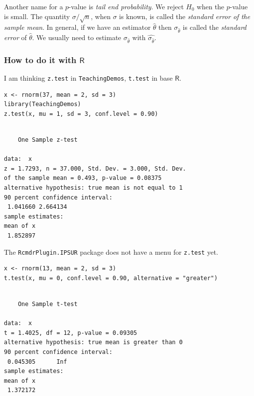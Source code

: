 \documentclass[captions=tableheading]{scrbook}
\begin{document}
\begin{rem}
Another name for a \(p\)-value is \emph{tail end probability}. We reject \(H_{0}\) when the \(p\)-value is small.
The quantity \(\sigma/\sqrt{n}\), when \(\sigma\) is known, is called the \emph{standard error of the sample mean}. In general, if we have an estimator \(\hat{\theta}\) then \(\sigma_{\hat{\theta}}\) is called the \emph{standard error} of \(\hat{\theta}\). We usually need to estimate \(\sigma_{\hat{\theta}}\) with \(\hat{\sigma_{\hat{\theta}}}\).
\end{rem}
\subsubsection{How to do it with \(\mathsf{R}\)}
\label{sec-10-3-1-1}


I am thinking \texttt{z.test} in \texttt{TeachingDemos}, \texttt{t.test} in base \(\mathsf{R}\).


\lstset{language=R}
\begin{lstlisting}
x <- rnorm(37, mean = 2, sd = 3)
library(TeachingDemos)
z.test(x, mu = 1, sd = 3, conf.level = 0.90)
\end{lstlisting}


\begin{verbatim}
 
	One Sample z-test

data:  x 
z = 1.7293, n = 37.000, Std. Dev. = 3.000, Std. Dev.
of the sample mean = 0.493, p-value = 0.08375
alternative hypothesis: true mean is not equal to 1 
90 percent confidence interval:
 1.041660 2.664134 
sample estimates:
mean of x 
 1.852897
\end{verbatim}

The \texttt{RcmdrPlugin.IPSUR} package does not have a menu for \texttt{z.test} yet. 


\lstset{language=R}
\begin{lstlisting}
x <- rnorm(13, mean = 2, sd = 3)
t.test(x, mu = 0, conf.level = 0.90, alternative = "greater")
\end{lstlisting}


\begin{verbatim}

	One Sample t-test

data:  x 
t = 1.4025, df = 12, p-value = 0.09305
alternative hypothesis: true mean is greater than 0 
90 percent confidence interval:
 0.045305      Inf 
sample estimates:
mean of x 
 1.372172
\end{verbatim}
\end{document}
